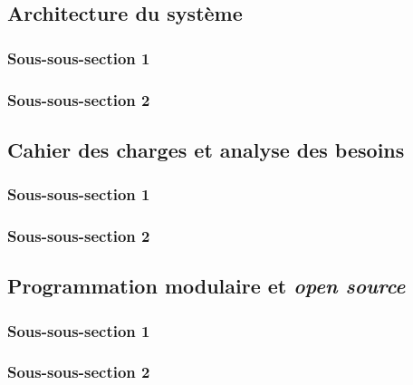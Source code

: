 
\subsection{Architecture du système}
    \subsubsection{Sous-sous-section 1}

    
    \subsubsection{Sous-sous-section 2}

    
    \subsection{Cahier des charges et analyse des besoins}
        \subsubsection{Sous-sous-section 1}


        \subsubsection{Sous-sous-section 2}


    \subsection{Programmation modulaire et \textit{open source}}
        \subsubsection{Sous-sous-section 1}


        \subsubsection{Sous-sous-section 2}

